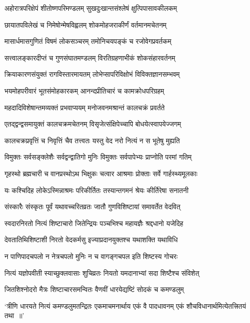 \twolineshloka
{अहोरात्रपरिक्षेपं शीतोष्णपरिमण्डलम्}
{सुखदुःखान्तसंश्लेषं क्षुत्पिपासावकीलकम्}


\twolineshloka
{छायातपविलेखं च निमेषोन्मेषविह्वलम्}
{शोकमोहजराकीर्णं वर्तमानमचेतनम्}


\twolineshloka
{मासार्धमासगुणितं विषमं लोकसञ्चरम्}
{तमोनिचयपङ्कं च रजोवेगप्रवर्तकम्}


\twolineshloka
{सत्त्वालङ्कारदीप्तं च गुणसंघातमण्डलम्}
{विरतिग्रहणाभीकं शोकसंहारवर्तनम्}


\twolineshloka
{क्रियाकारणसंयुक्तं रागविस्तारमायतम्}
{लोभेप्सापरिविक्षोभं विविक्तज्ञानसम्भवम्}


\twolineshloka
{भयमोहपरीवारं भूतसंमोहकारकम्}
{आनन्दप्रीतिचारं च कामक्रोधपरिग्रहम्}


\twolineshloka
{महदादिविशेषान्तमव्यक्तं प्रभवाप्ययम्}
{मनोजवनमश्रान्तं कालचक्रं प्रवर्तते}


\twolineshloka
{एतद्द्वन्द्वसमायुक्तं कालचक्रमचेतनम्}
{विसृजेत्संक्षिपेच्चापि बोधयेत्स्वापयेज्जगम्}


\twolineshloka
{कालचक्रप्रवृत्तिं च निवृत्तिं चैव तत्त्वतः}
{यस्तु वेद नरो नित्यं न स भूतेषु मुह्यति}


\twolineshloka
{विमुक्तः सर्वसङ्क्लेशैः सर्वद्वन्द्वातिगो मुनिः}
{विमुक्तः सर्वपापेभ्यः प्राप्नोति परमां गतिम्}


\twolineshloka
{गृहस्थो ब्रह्मचारी च वानप्रस्थोऽथ भिक्षुकः}
{चत्वार आश्रमाः प्रोक्ताः सर्वे गार्हस्थ्यमूलकाः}


\twolineshloka
{यः कश्चिदिह लोकेऽस्मिन्नाश्रमः परिकीर्तितः}
{तस्यान्तगमनं श्रेयः कीर्तिरेषा सनातनी}


\twolineshloka
{संस्कारैः संस्कृतः पूर्वं यथावच्चरितव्रतः}
{जातौ गुणविशिष्टायां समावर्तेत वेदवित्}


\twolineshloka
{स्वदारनिरतो नित्यं शिष्टाचारो जितेन्द्रियः}
{पञ्चभिश्च महायज्ञैः श्रद्दधानो यजेदिह}


\twolineshloka
{देवतातिथिशिष्टाशी निरतो वेदकर्मसु}
{इज्याप्रदानयुक्तश्च यथाशक्ति यथाविधि}


\twolineshloka
{न पाणिपादचपलो न नेत्रचपलो मुनिः}
{न च वागङ्गचपल इति शिष्टस्य गोचरः}


\twolineshloka
{नित्यं यज्ञोपवीती स्याच्छुक्लवासाः शुचिव्रतः}
{नियतो यमदानाभ्यां सदा शिष्टैश्च संविशेत्}


\twolineshloka
{जितशिश्नोदरो मैत्रः शिष्टाचारसमन्वितः}
{वैणवीं धारयेद्यष्टिं सोदकं च कमण्डलुम्}


\threelineshloka
{`त्रीणि धारयते नित्यं कमण्डलुमतन्द्रितः}
{एकमाचमनार्थाय एकं वै पादधावनम्}
{एकं शौचविधानार्थमित्येतत्त्रितयं तथा ॥'}


